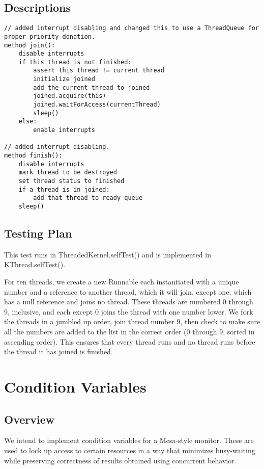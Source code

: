 \documentclass{article}
\begin{document}
\subsection{Descriptions} %

\scriptsize
\begin{lstlisting}
// added interrupt disabling and changed this to use a ThreadQueue for proper priority donation.
method join():
    disable interrupts
    if this thread is not finished:
        assert this thread != current thread
        initialize joined
        add the current thread to joined
        joined.acquire(this)
        joined.waitForAccess(currentThread)
        sleep()
    else:
        enable interrupts

// added interrupt disabling.
method finish():
    disable interrupts
    mark thread to be destroyed
    set thread status to finished
    if a thread is in joined:
        add that thread to ready queue
    sleep()
\end{lstlisting}
\normalsize

\subsection{Testing Plan}

This test runs in ThreadedKernel.selfTest() and is implemented in KThread.selfTest().

For ten threads, we create a new Runnable each instantiated with a unique number and a reference to another thread, which it will join, except one, which has a null reference and joins no thread. These threads are numbered 0 through 9, inclusive, and each except 0 joins the thread with one number lower. We fork the threads in a jumbled up order, join thread number 9, then check to make sure all the numbers are added to the list in the correct order (0 through 9, sorted in ascending order). This ensures that every thread runs and no thread runs before the thread it has joined is finished.

\section{Condition Variables}

\subsection{Overview}

We intend to implement condition variables for a Mesa-style monitor. These are used to lock up access to certain resources in a way that minimizes busy-waiting while preserving correctness of results obtained using concurrent behavior.
\end{document}
